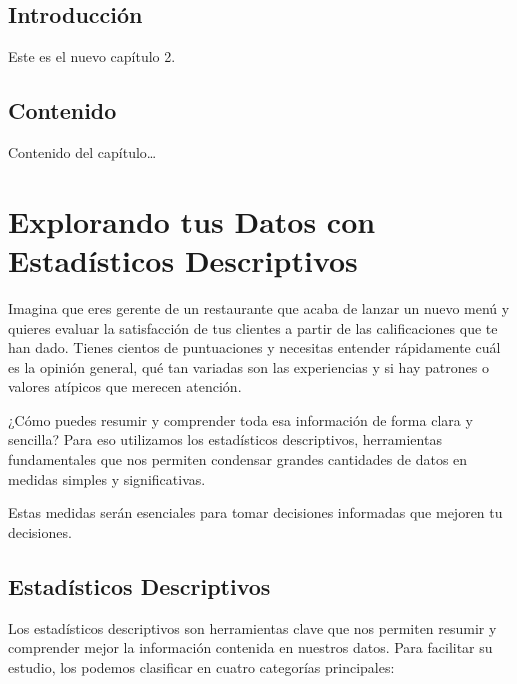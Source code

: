 \documentclass[
  spanish,
  letterpaper,
  DIV=11,
  numbers=noendperiod]{scrreprt}
\begin{document}
\section{Introducción}\label{introducciuxf3n}

Este es el nuevo capítulo 2.

\section{Contenido}\label{contenido}

Contenido del capítulo\ldots{}


\chapter{Explorando tus Datos con Estadísticos
Descriptivos}\label{explorando-tus-datos-con-estaduxedsticos-descriptivos}

Imagina que eres gerente de un restaurante que acaba de lanzar un nuevo
menú y quieres evaluar la satisfacción de tus clientes a partir de las
calificaciones que te han dado. Tienes cientos de puntuaciones y
necesitas entender rápidamente cuál es la opinión general, qué tan
variadas son las experiencias y si hay patrones o valores atípicos que
merecen atención.

¿Cómo puedes resumir y comprender toda esa información de forma clara y
sencilla? Para eso utilizamos los estadísticos descriptivos,
herramientas fundamentales que nos permiten condensar grandes cantidades
de datos en medidas simples y significativas.

Estas medidas serán esenciales para tomar decisiones informadas que
mejoren tu decisiones.

\section{Estadísticos Descriptivos}\label{estaduxedsticos-descriptivos}

Los estadísticos descriptivos son herramientas clave que nos permiten
resumir y comprender mejor la información contenida en nuestros datos.
Para facilitar su estudio, los podemos clasificar en cuatro categorías
principales:
\end{document}
